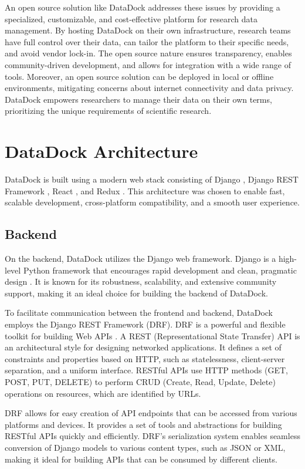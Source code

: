 \documentclass[conference]{IEEEtran}
\begin{document}
An open source solution like DataDock addresses these issues by providing a specialized, customizable, and cost-effective platform for research data management. By hosting DataDock on their own infrastructure, research teams have full control over their data, can tailor the platform to their specific needs, and avoid vendor lock-in. The open source nature ensures transparency, enables community-driven development, and allows for integration with a wide range of tools. Moreover, an open source solution can be deployed in local or offline environments, mitigating concerns about internet connectivity and data privacy. DataDock empowers researchers to manage their data on their own terms, prioritizing the unique requirements of scientific research.

\section{DataDock Architecture}
DataDock is built using a modern web stack consisting of Django \cite{django}, Django REST Framework \cite{djangorest}, React \cite{react}, and Redux \cite{redux}. This architecture was chosen to enable fast, scalable development, cross-platform compatibility, and a smooth user experience.

\subsection{Backend}

On the backend, DataDock utilizes the Django web framework. Django is a high-level Python framework that encourages rapid development and clean, pragmatic design \cite{django}. It is known for its robustness, scalability, and extensive community support, making it an ideal choice for building the backend of DataDock.

To facilitate communication between the frontend and backend, DataDock employs the Django REST Framework (DRF). DRF is a powerful and flexible toolkit for building Web APIs \cite{djangorest}. A REST (Representational State Transfer) API is an architectural style for designing networked applications. It defines a set of constraints and properties based on HTTP, such as statelessness, client-server separation, and a uniform interface. RESTful APIs use HTTP methods (GET, POST, PUT, DELETE) to perform CRUD (Create, Read, Update, Delete) operations on resources, which are identified by URLs.

DRF allows for easy creation of API endpoints that can be accessed from various platforms and devices. It provides a set of tools and abstractions for building RESTful APIs quickly and efficiently. DRF's serialization system enables seamless conversion of Django models to various content types, such as JSON or XML, making it ideal for building APIs that can be consumed by different clients.
\end{document}
